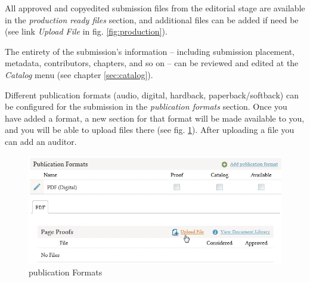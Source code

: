 
All approved and copyedited submission files from the editorial stage are available in the \textit{production ready files} section, and additional files can be added if need be (see link \textit{Upload File} in fig. \ref{fig:production}).

The entirety of the submission's information -- including submission placement, metadata, contributors, chapters, and so on -- can be reviewed and edited at the \textit{Catalog} menu (see chapter \ref{sec:catalog}).

Different publication formats (audio, digital, hardback, paperback/softback) can be configured for the submission in the \textit{publication formats} section. Once you have added a format, a new section for that format will be made available to you, and you will be able to upload files there (see fig. \ref{fig:publicationFormats}). After uploading a file you can add an auditor.

\begin{figure}[h] \centering
\includegraphics[width=1\textwidth]{./img/publicationFormats.jpg} \caption{publication Formats}
\label{fig:publicationFormats}
\end{figure}



